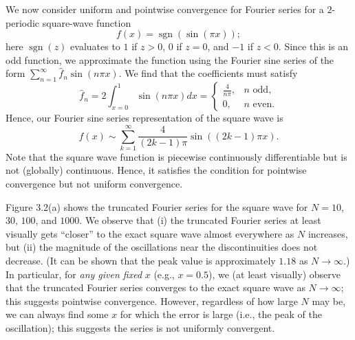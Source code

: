 \begin{example}
    We now consider uniform and pointwise convergence for Fourier series for a $2$-periodic square-wave function
    \[f(x) = \operatorname{sgn}(\sin(\pi x));\]
    here $\operatorname{sgn}(z)$ evaluates to $1$ if $z > 0$, $0$ if $z = 0$, and $-1$ if $z < 0$. Since this is an odd function, we approximate the function using the Fourier sine series of the form $\sum_{n=1}^{\infty} \hat{f}_n \sin(n\pi x)$. We find that the coefficients must satisfy
    \[\hat{f}_n = 2 \int_{x=0}^{1} \sin(n\pi x) dx = \begin{cases} \frac{4}{n\pi}, & n \text{ odd}, \\ 0, & n \text{ even}. \end{cases}\]
    Hence, our Fourier sine series representation of the square wave is
    \[f(x) \sim \sum_{k=1}^{\infty} \frac{4}{(2k - 1)\pi} \sin((2k - 1)\pi x).\]
    Note that the square wave function is piecewise continuously differentiable but is not (globally) continuous. Hence, it satisfies the condition for pointwise convergence but not uniform convergence.


    Figure 3.2(a) shows the truncated Fourier series for the square wave for $N = 10$, $30$, $100$, and $1000$. We observe that (i) the truncated Fourier series at least visually gets ``closer'' to the exact square wave almost everywhere as $N$ increases, but (ii) the magnitude of the oscillations near the discontinuities does not decrease. (It can be shown that the peak value is approximately $1.18$ as $N \to \infty$.) In particular, for \textit{any given fixed} $x$ (e.g., $x = 0.5$), we (at least visually) observe that the truncated Fourier series converges to the exact square wave as $N \to \infty$; this suggests pointwise convergence. However, regardless of how large $N$ may be, we can always find some $x$ for which the error is large (i.e., the peak of the oscillation); this suggests the series is not uniformly convergent.


\end{example}
